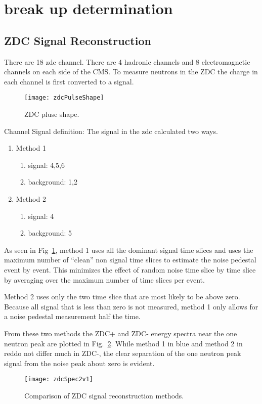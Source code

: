  \section{break up determination}
    \subsection{ZDC Signal Reconstruction}
      There are 18 zdc channel. 
      There are 4 hadronic channels and 8 electromagnetic channels on each side
        of the CMS. 
      To measure neutrons in the ZDC the charge in each channel is first 
        converted to a signal. 

	\begin{figure}[h]
		\centering
		\texttt{[image: zdcPulseShape]}
		\caption{ZDC pluse shape.}
		\label{fig:zdcPulseShape}
	\end{figure}

      Channel Signal definition:
      The signal in the zdc calculated two ways. 
      \begin{enumerate}
	\item Method 1
	\begin{enumerate}
	  \item signal: 4,5,6 
          \item background: 1,2
        \end{enumerate}
	\item Method 2
	\begin{enumerate}
	  \item signal: 4
	  \item background: 5
        \end{enumerate}
      \end{enumerate}

      As seen in Fig~\ref{fig:zdcPulseShape}, method 1 uses all the dominant 
        signal time slices and uses the maximum number of “clean” non signal 
        time slices to estimate the noise pedestal event by event. 
      This minimizes the effect of random noise time slice by time slice by 
        averaging over the maximum number of time slices per event. 

      Method 2 uses only the two time slice that are most likely to be above 
        zero. 
      Because all signal that is less than zero is not measured, method 1 
        only allows for a noise pedestal measurement half the time.
    
      From these two methods the ZDC+ and ZDC- energy spectra near the 
        one neutron peak are plotted in Fig.~\ref{fig:zdcSpec2v1}.
      While method 1 in blue and method 2 in reddo not differ much in ZDC-, 
        the clear separation of the one neutron peak signal from the noise 
        peak about zero is evident. 
      \begin{figure}[h]
        \centering
        \texttt{[image: zdcSpec2v1]}
        \caption{Comparison of ZDC signal reconstruction methods.}
        \label{fig:zdcSpec2v1}
      \end{figure}

